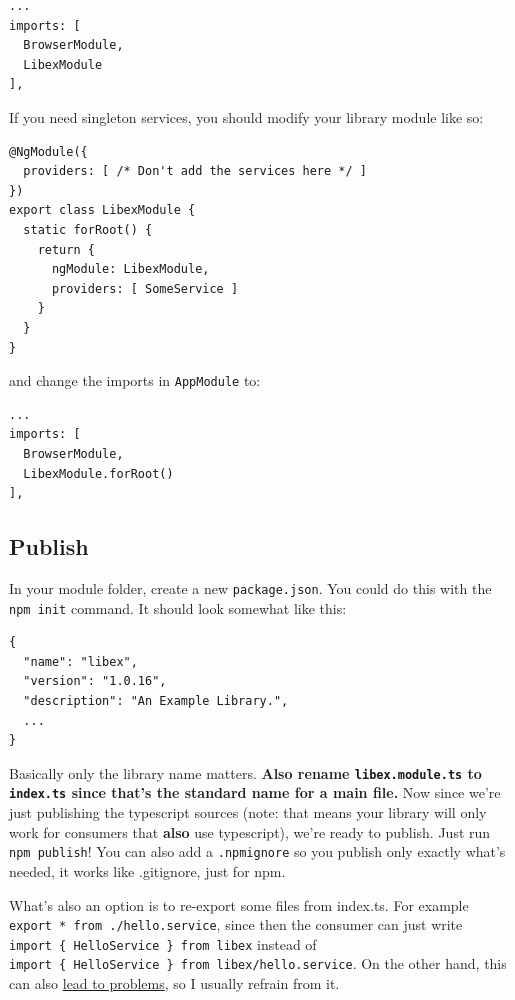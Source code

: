 \documentclass[12pt,a4paper]{article}
\begin{document}
\begin{lstlisting}
...
imports: [
  BrowserModule,
  LibexModule
],
\end{lstlisting}

If you need singleton services, you should modify your library module
like so:

\begin{lstlisting}
@NgModule({
  providers: [ /* Don't add the services here */ ]
})
export class LibexModule {
  static forRoot() {
    return {
      ngModule: LibexModule,
      providers: [ SomeService ]
    }
  }
}
\end{lstlisting}

and change the imports in \texttt{AppModule} to:

\begin{lstlisting}
...
imports: [
  BrowserModule,
  LibexModule.forRoot()
],
\end{lstlisting}

\subsection{\texorpdfstring{{}
Publish}{Publish}}\label{step-4-publish}

In your module folder, create a new \texttt{package.json}. You could do
this with the \texttt{npm\ init} command. It should look somewhat like
this:

\begin{lstlisting}
{
  "name": "libex",
  "version": "1.0.16",
  "description": "An Example Library.",
  ...
}
\end{lstlisting}

Basically only the library name matters. \textbf{Also rename
\texttt{libex.module.ts} to \texttt{index.ts} since that's the standard
name for a main file.} Now since we're just publishing the typescript
sources (note: that means your library will only work for consumers that
\textbf{also} use typescript), we're ready to publish. Just run
\texttt{npm\ publish}! You can also add a \texttt{.npmignore} so you
publish only exactly what's needed, it works like .gitignore, just for
npm.

What's also an option is to re-export some files from index.ts. For
example
\texttt{export\ *\ from\ \textquotesingle{}./hello.service\textquotesingle{}},
since then the consumer can just write
\texttt{import\ \{\ HelloService\ \}\ from\ \textquotesingle{}libex\textquotesingle{}}
instead of
\texttt{import\ \{\ HelloService\ \}\ from\ \textquotesingle{}libex/hello.service\textquotesingle{}}.
On the other hand, this can also
\href{https://stackoverflow.com/a/38000323/3022127}{lead to problems},
so I usually refrain from it.
\end{document}
